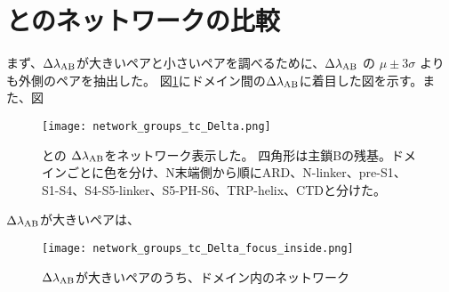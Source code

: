 \section{\openFortyTwo と\closeFortyTwo のネットワークの比較}

まず、$\Delta \lambda_{\rm{AB}}$が大きいペアと小さいペアを調べるために、$\Delta \lambda_{\rm{AB}}$ の $\mu \pm 3 \sigma$ よりも外側のペアを抽出した。
図\ref{fig:network_groups_tc_Delta}にドメイン間の$\Delta \lambda_{\rm{AB}}$に着目した図を示す。また、図

\begin{figure}
  \centering
  \texttt{[image: network\_groups\_tc\_Delta.png]}
  \caption{\openFortyTwo と\closeFortyTwo の $\Delta \lambda_{\rm{AB}}$をネットワーク表示した。
            四角形は主鎖Bの残基。ドメインごとに色を分け、N末端側から順にARD、N-linker、pre-S1、S1-S4、S4-S5-linker、S5-PH-S6、TRP-helix、CTDと分けた。
            \autocite{pumroy_structural_2020}}
  \label{fig:network_groups_tc_Delta}
\end{figure}

$\Delta \lambda_{\rm{AB}}$が大きいペアは、

\begin{figure}
  \centering
  \texttt{[image: network\_groups\_tc\_Delta\_focus\_inside.png]}
  \caption{$\Delta \lambda_{\rm{AB}}$が大きいペアのうち、ドメイン内のネットワーク}
  \label{fig:network_groups_tc_Delta_large}
\end{figure}